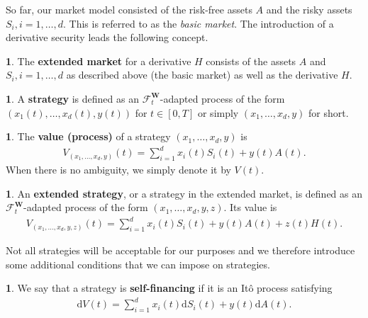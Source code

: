 \documentclass[english]{article}
\numberwithin{equation}{section}
\numberwithin{figure}{section}
\theoremstyle{bolddescit}
\theoremstyle{definition}
\newtheorem{definition}[theorem]{\protect\definitionname}
\theoremstyle{definition}
\theoremstyle{plain}
\theoremstyle{plain}
\theoremstyle{bolddesc}
\theoremstyle{plain}
\theoremstyle{remark}
\providecommand{\definitionname}{Definition}
\begin{document}
So far, our market model consisted of the risk-free assets $A$ and the risky assets $S_i, i=1,\ldots,d$. This is referred to as the \textit{basic market}. The introduction of a derivative security leads the following concept.

\begin{definition}
  The \textbf{extended market} for a derivative $H$ consists of the assets $A$ and $S_i, i=1,\ldots,d$ as described above (the basic market) as well as the derivative $H$.
\end{definition}

\begin{definition}
  A \textbf{strategy} is defined as an $\mathcal{F}^\mathbf{W}_t$-adapted process of the form\\ $(x_1(t),\ldots,x_d(t),y(t))$ for $t \in [0,T]$ or simply $(x_1,\ldots,x_d,y)$ for short.
\end{definition}

\begin{definition}
  The \textbf{value (process)} of a strategy $(x_1,\ldots,x_d,y)$ is
  \begin{align*}
    V_{(x_1,\ldots,x_d,y)}(t) = \sum_{i=1}^d x_i(t) S_i(t) + y(t) A(t).
  \end{align*}
  When there is no ambiguity, we simply denote it by $V(t)$.
\end{definition}

\begin{definition}
  An \textbf{extended strategy}, or a strategy in the extended market, is defined as an $\mathcal{F}^\mathbf{W}_t$-adapted process of the form $(x_1,\ldots,x_d,y,z)$. Its value is
  \begin{align*}
    V_{(x_1,\ldots,x_d,y,z)}(t)
    = \sum_{i=1}^d x_i(t) S_i(t) + y(t) A(t) + z(t) H(t).
  \end{align*}
\end{definition}

Not all strategies will be acceptable for our purposes and we therefore introduce some additional conditions that we can impose on strategies.

\begin{definition}
  We say that a strategy is \textbf{self-financing} if it is an It\^o process satisfying
  \begin{align*}
    \mathrm{d}V(t) = \sum_{i=1}^d x_i(t) \mathrm{d}S_i(t) + y(t) \mathrm{d}A(t).
  \end{align*}
\end{definition}
\end{document}

